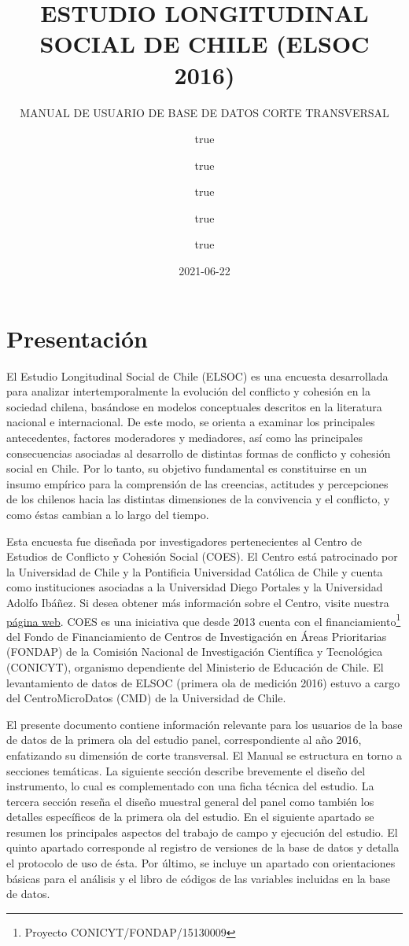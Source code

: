 \documentclass[
]{book}
\title{ESTUDIO LONGITUDINAL SOCIAL DE CHILE (ELSOC 2016)}
\subtitle{MANUAL DE USUARIO DE BASE DE DATOS CORTE TRANSVERSAL}
\author{true \and true \and true \and true \and true}
\date{2021-06-22}
\begin{document}
\frontmatter
\maketitle

\mainmatter
\hypertarget{present}{%
\chapter{Presentación}\label{present}}

El Estudio Longitudinal Social de Chile (ELSOC) es una encuesta
desarrollada para analizar intertemporalmente la evolución del conflicto
y cohesión en la sociedad chilena, basándose en modelos conceptuales
descritos en la literatura nacional e internacional. De este modo, se
orienta a examinar los principales antecedentes, factores moderadores y
mediadores, así como las principales consecuencias asociadas al
desarrollo de distintas formas de conflicto y cohesión social en Chile.
Por lo tanto, su objetivo fundamental es constituirse en un insumo
empírico para la comprensión de las creencias, actitudes y percepciones
de los chilenos hacia las distintas dimensiones de la convivencia y el
conflicto, y como éstas cambian a lo largo del tiempo.

Esta encuesta fue diseñada por investigadores pertenecientes al Centro
de Estudios de Conflicto y Cohesión Social (COES). El Centro está
patrocinado por la Universidad de Chile y la Pontificia Universidad
Católica de Chile y cuenta como instituciones asociadas a la Universidad
Diego Portales y la Universidad Adolfo Ibáñez. Si desea obtener más
información sobre el Centro, visite nuestra
\href{http://www.coes.cl/}{página web}. COES es una iniciativa que desde
2013 cuenta con el financiamiento\footnote{Proyecto
  CONICYT/FONDAP/15130009} del Fondo de Financiamiento de Centros de
Investigación en Áreas Prioritarias (FONDAP) de la Comisión Nacional de
Investigación Científica y Tecnológica (CONICYT), organismo dependiente
del Ministerio de Educación de Chile. El levantamiento de datos de ELSOC
(primera ola de medición 2016) estuvo a cargo del CentroMicroDatos (CMD)
de la Universidad de Chile.

El presente documento contiene información relevante para los usuarios
de la base de datos de la primera ola del estudio panel, correspondiente
al año 2016, enfatizando su dimensión de corte transversal. El Manual se
estructura en torno a secciones temáticas. La siguiente sección describe
brevemente el diseño del instrumento, lo cual es complementado con una
ficha técnica del estudio. La tercera sección reseña el diseño muestral
general del panel como también los detalles específicos de la primera
ola del estudio. En el siguiente apartado se resumen los principales
aspectos del trabajo de campo y ejecución del estudio. El quinto
apartado corresponde al registro de versiones de la base de datos y
detalla el protocolo de uso de ésta. Por último, se incluye un apartado
con orientaciones básicas para el análisis y el libro de códigos de las
variables incluidas en la base de datos.
\end{document}
